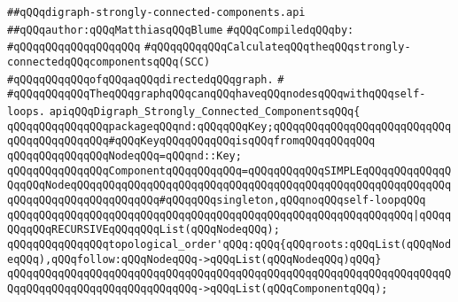 \label{src/lib/src/digraph-strongly-connected-components.api}
\verb|##qQQqdigraph-strongly-connected-components.api|\newline
\verb|##qQQqauthor:qQQqMatthiasqQQqBlume|\newline
\newline
\verb|#qQQqCompiledqQQqby:|\newline
\verb|#qQQqqQQqqQQqqQQqqQQq|\newline
\newline
\newline
\newline
\verb|#qQQqqQQqqQQqCalculateqQQqtheqQQqstrongly-connectedqQQqcomponentsqQQq(SCC)|\newline
\verb|#qQQqqQQqqQQqofqQQqaqQQqdirectedqQQqgraph.|\newline
\verb|#|\newline
\verb|#qQQqqQQqqQQqTheqQQqgraphqQQqcanqQQqhaveqQQqnodesqQQqwithqQQqself-loops.|\newline
\newline
\newline
\verb|apiqQQqDigraph_Strongly_Connected_ComponentsqQQq{|\newline
\newline
\verb|qQQqqQQqqQQqqQQqpackageqQQqnd:qQQqqQQqKey;qQQqqQQqqQQqqQQqqQQqqQQqqQQqqQQqqQQqqQQqqQQq#qQQqKeyqQQqqQQqqQQqisqQQqfromqQQqqQQqqQQq|\newline
\newline
\verb|qQQqqQQqqQQqqQQqNodeqQQq=qQQqnd::Key;|\newline
\newline
\verb|qQQqqQQqqQQqqQQqComponentqQQqqQQqqQQq=qQQqqQQqqQQqSIMPLEqQQqqQQqqQQqqQQqqQQqNodeqQQqqQQqqQQqqQQqqQQqqQQqqQQqqQQqqQQqqQQqqQQqqQQqqQQqqQQqqQQqqQQqqQQqqQQqqQQqqQQqqQQq#qQQqqQQqsingleton,qQQqnoqQQqself-loopqQQq|\newline
\verb|qQQqqQQqqQQqqQQqqQQqqQQqqQQqqQQqqQQqqQQqqQQqqQQqqQQqqQQqqQQqqQQq|\verb#|qQQqqQQqqQQqRECURSIVEqQQqqQQqList(qQQqNodeqQQq);#\newline
\newline
\verb|qQQqqQQqqQQqqQQqtopological_order'qQQq:qQQq{qQQqroots:qQQqList(qQQqNodeqQQq),qQQqfollow:qQQqNodeqQQq->qQQqList(qQQqNodeqQQq)qQQq}|\newline
\verb|qQQqqQQqqQQqqQQqqQQqqQQqqQQqqQQqqQQqqQQqqQQqqQQqqQQqqQQqqQQqqQQqqQQqqQQqqQQqqQQqqQQqqQQqqQQqqQQqqQQq->qQQqList(qQQqComponentqQQq);|\newline
